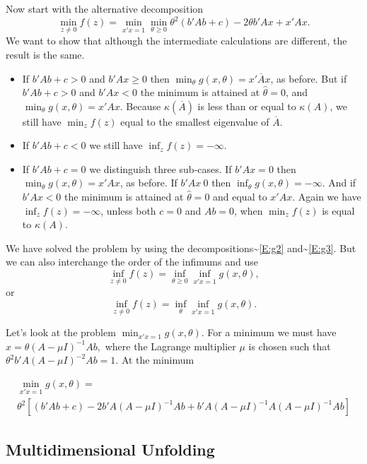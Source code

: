 \documentclass[
  12pt,
]{book}
\begin{document}
Now start with the alternative decomposition
\[
\min_{z\not= 0}f(z)=\min_{x'x=1}\min_{\theta\geq 0}\theta^{2}(b'Ab+c)-2\theta b'Ax+x'Ax.
\]
We want to show that although the intermediate calculations are different, the
result is the same.

\begin{itemize}
\item
  If \(b'Ab+c>0\) and \(b'Ax\geq 0\) then \(\min_{\theta }g(x,\theta)=x'\overline Ax\),
  as before. But if \(b'Ab+c>0\) and \(b'Ax<0\) the minimum is attained at \(\hat\theta=0\),
  and \(\min_{\theta }g(x,\theta)=x'Ax\). Because \(\kappa(\overline A)\)
  is less than or equal to \(\kappa(A)\), we still have \(\min_{z} f(z)\) equal to the smallest eigenvalue of \(\overline A\).
\item
  If \(b'Ab+c<0\) we still have \(\inf_{z} f(z)=-\infty\).
\item
  If \(b'Ab+c=0\) we distinguish three sub-cases. If \(b'Ax=0\) then \(\min_{\theta }g(x,\theta)=x'Ax\),
  as before. If \(b'Ax\>0\) then \(\inf_{\theta} g(x,\theta)=-\infty\). And if \(b'Ax<0\)
  the minimum is attained at \(\hat\theta=0\) and equal to \(x'Ax\).
  Again we have \(\inf_{z} f(z)=-\infty\), unless both \(c=0\) and \(Ab=0\), when \(\min_{z} f(z)\) is equal to \(\kappa(A)\).
\end{itemize}

We have solved the problem by using the decompositions\textasciitilde{}\eqref{E:g2} and\textasciitilde{}\eqref{E:g3}. But we can
also interchange the order of the infimums and use
\[
\inf_{z\not= 0}  f(z)=\inf_{\theta\geq 0}\inf_{x'x=1}g(x,\theta),
\]
or
\[
\inf_{z\not= 0}  f(z)=\inf_{\theta}\inf_{x'x=1}g(x,\theta).
\]

Let's look at the problem \(\min_{x'x=1}g(x,\theta)\). For a minimum we must have \(x=\theta(A-\mu I)^{-1}Ab,\)
where the Lagrange multiplier \(\mu\) is chosen such that \(\theta^{2}b'A(A-\mu I)^{-2}Ab=1\). At the minimum

\begin{multline*}
\min_{x'x=1}g(x,\theta)=\\\theta^{2}[(b'Ab+c)-2b'A(A-\mu I)^{-1}Ab+b'A(A-\mu I)^{-1}A(A-\mu I)^{-1}Ab]
\end{multline*}

\hypertarget{multidimensional-unfolding}{%
\subsection{Multidimensional Unfolding}\label{multidimensional-unfolding}}
\end{document}
